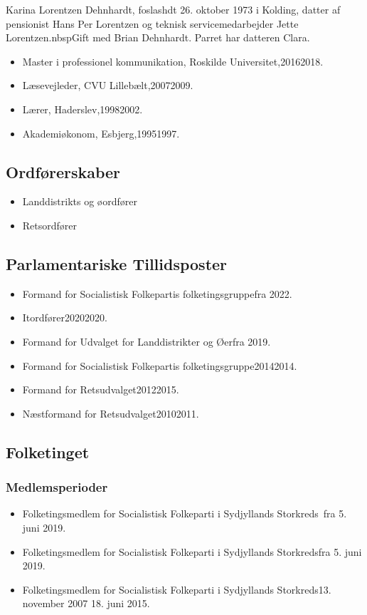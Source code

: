 \documentclass[11pt, a4paper]{awesome-cv}
\begin{document}
\makecvheader[R]
\makelettertitle
\begin{cvletter}
Karina Lorentzen Dehnhardt, foslashdt 26. oktober 1973 i Kolding, datter af pensionist Hans Per Lorentzen og teknisk servicemedarbejder Jette Lorentzen.nbspGift med Brian Dehnhardt. Parret har datteren Clara.

\begin{itemize}
\item Master i professionel kommunikation, Roskilde Universitet,20162018.
\item Læsevejleder, CVU Lillebælt,20072009.
\item Lærer, Haderslev,19982002.
\item Akademiøkonom, Esbjerg,19951997.
\end{itemize}
\subsection*{Ordførerskaber}
\begin{itemize}
\item Landdistrikts og øordfører
\item Retsordfører
\end{itemize}
\subsection*{Parlamentariske Tillidsposter}
\begin{itemize}
\item Formand for Socialistisk Folkepartis folketingsgruppefra 2022.
\item Itordfører20202020.
\item Formand for Udvalget for Landdistrikter og Øerfra 2019.
\item Formand for Socialistisk Folkepartis folketingsgruppe20142014.
\item Formand for Retsudvalget20122015.
\item Næstformand for Retsudvalget20102011.
\end{itemize}
\subsection*{Folketinget}
\subsubsection*{Medlemsperioder}
\begin{itemize}
\item Folketingsmedlem for Socialistisk Folkeparti i Sydjyllands Storkreds fra 5. juni 2019.
\item Folketingsmedlem for Socialistisk Folkeparti i Sydjyllands Storkredsfra 5. juni 2019.
\item Folketingsmedlem for Socialistisk Folkeparti i Sydjyllands Storkreds13. november 2007  18. juni 2015.
\end{itemize}

\end{cvletter}
\end{document}

